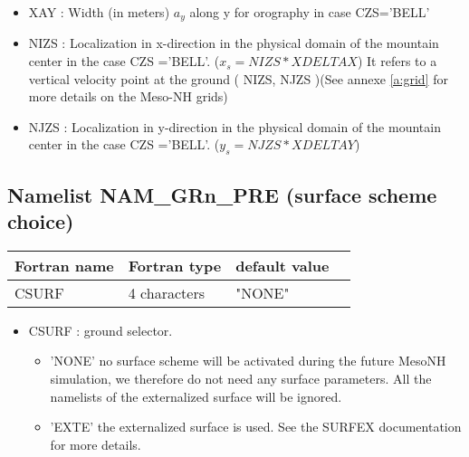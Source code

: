 \begin{itemize}
\item   XAY  :  Width  (in meters)
$a_{y}$ along y  for orography in case CZS='BELL'

\item  NIZS :  Localization in x-direction in the physical domain of the mountain center in 
the  case CZS ='BELL'. ($x_{s} = NIZS * XDELTAX$) It refers to a vertical
velocity point at the ground ( NIZS, NJZS )(See annexe \ref{a:grid} for more details on the Meso-NH grids)

\item   NJZS : Localization in y-direction in the physical domain of the mountain center in 
 the     case CZS ='BELL'. ($y_{s} = NJZS * XDELTAY$)

\end{itemize}


\subsection{Namelist NAM\_GRn\_PRE (surface scheme choice)}

\begin{center}
\begin{tabular} {|l|l|l|l|}
\hline
Fortran name & Fortran type & default value \\
\hline
\hline
CSURF    & 4 characters   &  "NONE"  \\
\hline
\end{tabular}
\end{center}

\begin{itemize}

\item
CSURF : ground selector.

\begin{itemize}
\item 'NONE' no surface scheme will be activated during the future MesoNH
simulation, we therefore do not need any surface parameters. All the namelists of the externalized surface will be ignored.

\item 'EXTE' the externalized surface is used. See the SURFEX documentation for more details.
\end{itemize}  

\end{itemize}  

